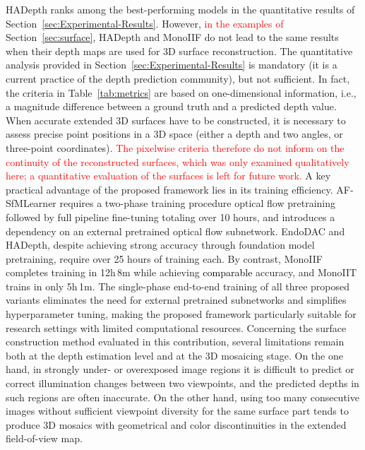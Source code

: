 \documentclass[a4paper,fleqn]{cas-dc}
\begin{document}
%
HADepth ranks among the best-performing models in the quantitative results of Section~\ref{sec:Experimental-Results}. However, \textcolor{red}{in the examples of} Section~\ref{sec:surface}, HADepth and MonoIIF do not lead to the same results when their depth maps are used for 3D surface reconstruction. The quantitative analysis provided in Section~\ref{sec:Experimental-Results} is mandatory (it is a current practice of the depth prediction community), but not sufficient. In fact, the criteria in Table~\ref{tab:metrics} are based on one-dimensional information, i.e., a magnitude difference between a ground truth and a predicted depth value. When accurate extended 3D surfaces have to be constructed, it is necessary to assess precise point positions in a 3D space (either a depth and two angles, or three-point coordinates). \textcolor{red}{The pixelwise criteria therefore do not inform on the continuity of the reconstructed surfaces, which was only examined qualitatively here; a quantitative evaluation of the surfaces is left for future work.}
%
A key practical advantage of the proposed framework lies in its training efficiency. AF-SfMLearner requires a two-phase training procedure optical flow pretraining followed by full pipeline fine-tuning totaling over 10 hours, and introduces a dependency on an external pretrained optical flow subnetwork. EndoDAC and HADepth, despite achieving strong accuracy through foundation model pretraining, require over 25 hours of training each. By contrast, MonoIIF completes training in 12h\,8m while achieving \textcolor{black}{comparable} accuracy, and MonoIIT trains in only 5h\,1m. The single-phase end-to-end training of all three proposed variants eliminates the need for external pretrained subnetworks and simplifies hyperparameter tuning, making the proposed framework particularly suitable for research settings with limited computational resources.
%
Concerning the surface construction method evaluated in this contribution, several limitations remain both at the depth estimation level and at the 3D mosaicing stage. On the one hand, in strongly under- or overexposed image regions it is difficult to predict or correct illumination changes between two viewpoints, and the predicted depths in such regions are often inaccurate. On the other hand, using too many consecutive images without sufficient viewpoint diversity for the same surface part tends to produce 3D mosaics with geometrical and color discontinuities in the extended field-of-view map.
%
\end{document}
